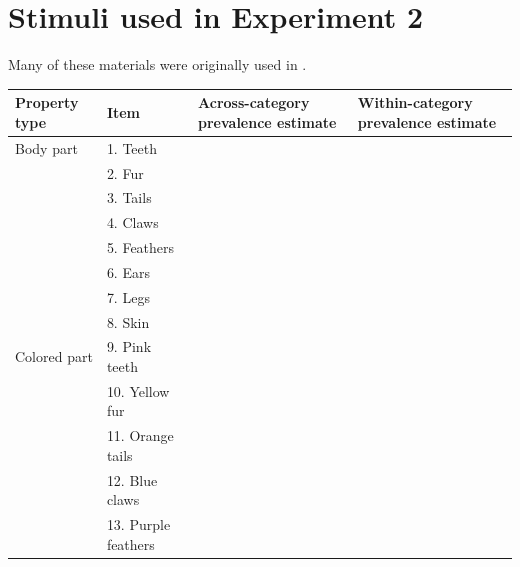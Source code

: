\documentclass[10pt,letterpaper]{article}
\begin{document}
\section{Stimuli used in Experiment 2}
\label{sec:materials2}

Many of these materials were originally used in .

\begin{table}[h]
\begin{tabular}{| l || l | l | l |}
\hline
Property type               & Item                    & Across-category prevalence estimate  & Within-category prevalence estimate \\
\hline \hline
Body part       			& 1. Teeth    &   &                     \\
                                          & 2. Fur                       &                &                     \\
                                          & 3. Tails                     &                &                     \\
                                          & 4. Claws                       &                &                     \\
                                          & 5. Feathers                       &                &                     \\
                                          & 6. Ears                       &                &                     \\
                                          & 7. Legs                       &                &                     \\
                                          & 8. Skin                       &                &                     \\
Colored part      	 & 9. Pink teeth       &                &                     \\
                                          & 10. Yellow fur                       &                &                     \\
                                          & 11. Orange tails                         &                &                     \\
                                          & 12. Blue claws                       &                &                     \\
                                          & 13. Purple feathers                      &                &                     \\

\end{tabular}
\end{table}
\end{document}
